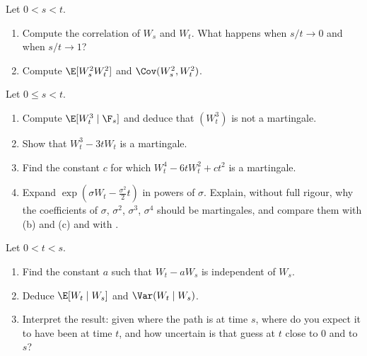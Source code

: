 
\begin{exercise}[Covariances]\label{ex:bm-moments}
\easy Let $0<s<t$.
\begin{enumerate}[label=(\alph*)]
  \item Compute the correlation of $W_s$ and $W_t$. What happens when $s/t\to0$ and when
    $s/t\to1$?
  \item Compute $\E[W_s^2W_t^2]$ and $\Cov(W_s^2,W_t^2)$.
\end{enumerate}
\end{exercise}

\begin{exercise}\label{ex:bm-hermite}
\easy Let $0\le s<t$.
\begin{enumerate}[label=(\alph*)]
  \item Compute $\E[W_t^3\mid\F_s]$ and deduce that $(W_t^3)$ is not a martingale.
  \item Show that $W_t^3-3tW_t$ is a martingale.
  \item Find the constant $c$ for which $W_t^4-6tW_t^2+ct^2$ is a martingale.
  \item Expand $\exp(\sigma W_t-\frac{\sigma^2}{2}t)$ in powers of $\sigma$. Explain,
    without full rigour, why the coefficients of $\sigma$, $\sigma^2$, $\sigma^3$,
    $\sigma^4$ should be martingales, and compare them with (b) and (c) and with
    .
\end{enumerate}
\end{exercise}

\begin{exercise}\label{ex:bm-bridge}
\medium Let $0<t<s$.
\begin{enumerate}[label=(\alph*)]
  \item Find the constant $a$ such that $W_t-aW_s$ is independent of $W_s$.
  \item Deduce $\E[W_t\mid W_s]$ and $\Var(W_t\mid W_s)$.
  \item Interpret the result: given where the path is at time $s$, where do you expect it
    to have been at time $t$, and how uncertain is that guess at $t$ close to $0$ and
    to $s$?
\end{enumerate}
\end{exercise}

